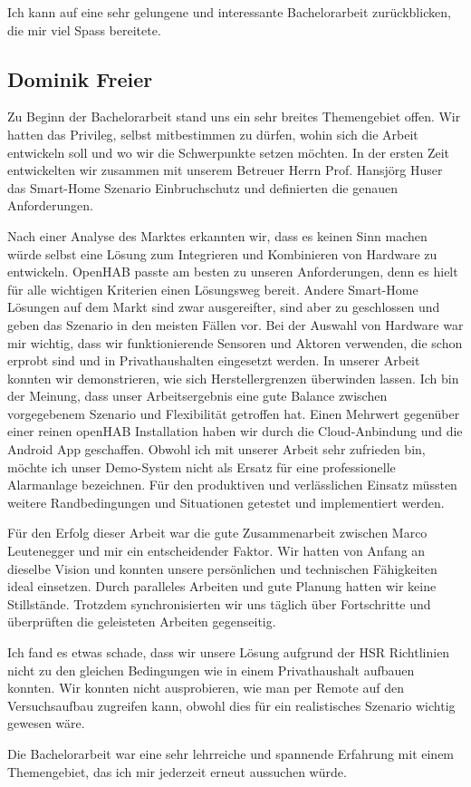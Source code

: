 Ich kann auf eine sehr gelungene und interessante Bachelorarbeit zurückblicken, die mir viel Spass bereitete.

\pagebreak

\subsection*{Dominik Freier}
Zu Beginn der Bachelorarbeit stand uns ein sehr breites Themengebiet offen. Wir hatten das Privileg, selbst mitbestimmen zu dürfen, wohin sich die Arbeit entwickeln soll und wo wir die Schwerpunkte setzen möchten. In der ersten Zeit entwickelten wir zusammen mit unserem Betreuer Herrn Prof. Hansjörg Huser das Smart-Home Szenario Einbruchschutz und definierten die genauen Anforderungen. 

Nach einer Analyse des Marktes erkannten wir, dass es keinen Sinn machen würde selbst eine Lösung zum Integrieren und Kombinieren von Hardware zu entwickeln. OpenHAB passte am besten zu unseren Anforderungen, denn es hielt für alle wichtigen Kriterien einen Lösungsweg bereit. Andere Smart-Home Lösungen auf dem Markt sind zwar ausgereifter, sind aber zu geschlossen und geben das Szenario in den meisten Fällen vor. Bei der Auswahl von Hardware war mir wichtig, dass wir funktionierende Sensoren und Aktoren verwenden, die schon erprobt sind und in Privathaushalten eingesetzt werden. In unserer Arbeit konnten wir demonstrieren, wie sich Herstellergrenzen überwinden lassen. Ich bin der Meinung, dass unser Arbeitsergebnis eine gute Balance zwischen vorgegebenem Szenario und Flexibilität getroffen hat. Einen Mehrwert gegenüber einer reinen openHAB Installation haben wir durch die Cloud-Anbindung und die Android App geschaffen. Obwohl ich mit unserer Arbeit sehr zufrieden bin, möchte ich unser Demo-System nicht als Ersatz für eine professionelle Alarmanlage bezeichnen. Für den produktiven und verlässlichen Einsatz müssten weitere Randbedingungen und Situationen getestet und implementiert werden.

Für den Erfolg dieser Arbeit war die gute Zusammenarbeit zwischen Marco Leutenegger und mir ein entscheidender Faktor. Wir hatten von Anfang an dieselbe Vision und konnten unsere persönlichen und technischen Fähigkeiten ideal einsetzen. Durch paralleles Arbeiten und gute Planung hatten wir keine Stillstände. Trotzdem synchronisierten wir uns täglich über Fortschritte und überprüften die geleisteten Arbeiten gegenseitig. 

Ich fand es etwas schade, dass wir unsere Lösung aufgrund der HSR Richtlinien nicht zu den gleichen Bedingungen wie in einem Privathaushalt aufbauen konnten. Wir konnten nicht ausprobieren, wie man per Remote auf den Versuchsaufbau zugreifen kann, obwohl dies für ein realistisches Szenario wichtig gewesen wäre.

Die Bachelorarbeit war eine sehr lehrreiche und spannende Erfahrung mit einem Themengebiet, das ich mir jederzeit erneut aussuchen würde.

